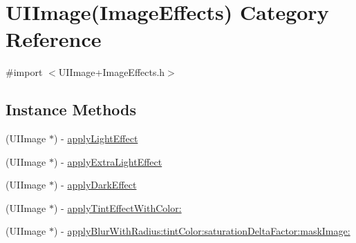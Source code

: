 \hypertarget{category_u_i_image_07_image_effects_08}{\section{U\-I\-Image(Image\-Effects) Category Reference}
\label{category_u_i_image_07_image_effects_08}
}


{\ttfamily \#import $<$U\-I\-Image+\-Image\-Effects.\-h$>$}

\subsection*{Instance Methods}
\begin{DoxyCompactItemize}
\item 
(U\-I\-Image $\ast$) -\/ \hyperlink{category_u_i_image_07_image_effects_08_a59ace2629fbde76c2aea75971dcd1a35}{apply\-Light\-Effect}
\item 
(U\-I\-Image $\ast$) -\/ \hyperlink{category_u_i_image_07_image_effects_08_a077bd168c85ec05ae267f4a72ccd3031}{apply\-Extra\-Light\-Effect}
\item 
(U\-I\-Image $\ast$) -\/ \hyperlink{category_u_i_image_07_image_effects_08_a91fdc853a968045b864eb63c6cecfc83}{apply\-Dark\-Effect}
\item 
(U\-I\-Image $\ast$) -\/ \hyperlink{category_u_i_image_07_image_effects_08_a15cb7a6c7faac2f762f188b1d4a25903}{apply\-Tint\-Effect\-With\-Color\-:}
\item 
(U\-I\-Image $\ast$) -\/ \hyperlink{category_u_i_image_07_image_effects_08_acc0986195832c228a0e11ca0bca3e8b8}{apply\-Blur\-With\-Radius\-:tint\-Color\-:saturation\-Delta\-Factor\-:mask\-Image\-:}
\end{DoxyCompactItemize}


